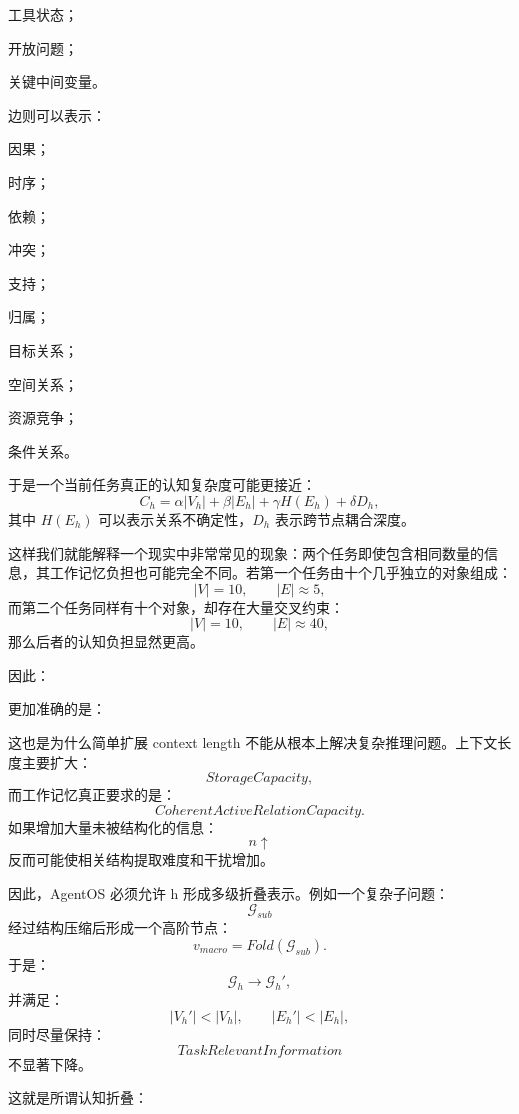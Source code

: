 工具状态；

开放问题；

关键中间变量。

边则可以表示：

因果；

时序；

依赖；

冲突；

支持；

归属；

目标关系；

空间关系；

资源竞争；

条件关系。

于是一个当前任务真正的认知复杂度可能更接近：
\[
C_h
=
\alpha |V_h|
+
\beta |E_h|
+
\gamma H(E_h)
+
\delta D_h,
\]
其中 $H(E_h)$ 可以表示关系不确定性，$D_h$ 表示跨节点耦合深度。

这样我们就能解释一个现实中非常常见的现象：两个任务即使包含相同数量的信息，其工作记忆负担也可能完全不同。若第一个任务由十个几乎独立的对象组成：
\[
|V|=10,\qquad |E|\approx 5,
\]
而第二个任务同样有十个对象，却存在大量交叉约束：
\[
|V|=10,\qquad |E|\approx40,
\]
那么后者的认知负担显然更高。

因此：
\begin{statementbox}
\centering
{}
\end{statementbox}
更加准确的是：
\begin{statementbox}
\centering
{}
\end{statementbox}

这也是为什么简单扩展 context length 不能从根本上解决复杂推理问题。上下文长度主要扩大：
\[
StorageCapacity,
\]
而工作记忆真正要求的是：
\[
CoherentActiveRelationCapacity.
\]
如果增加大量未被结构化的信息：
\[
n\uparrow
\]
反而可能使相关结构提取难度和干扰增加。

因此，AgentOS 必须允许 h 形成多级折叠表示。例如一个复杂子问题：
\[
\mathcal G_{sub}
\]
经过结构压缩后形成一个高阶节点：
\[
v_{macro}
=
Fold(\mathcal G_{sub}).
\]
于是：
\[
\mathcal G_h
\rightarrow
\mathcal G_h',
\]
并满足：
\[
|V_h'|<|V_h|,
\qquad
|E_h'|<|E_h|,
\]
同时尽量保持：
\[
TaskRelevantInformation
\]
不显著下降。

这就是所谓认知折叠：
\begin{statementbox}
\centering
{}
\end{statementbox}

